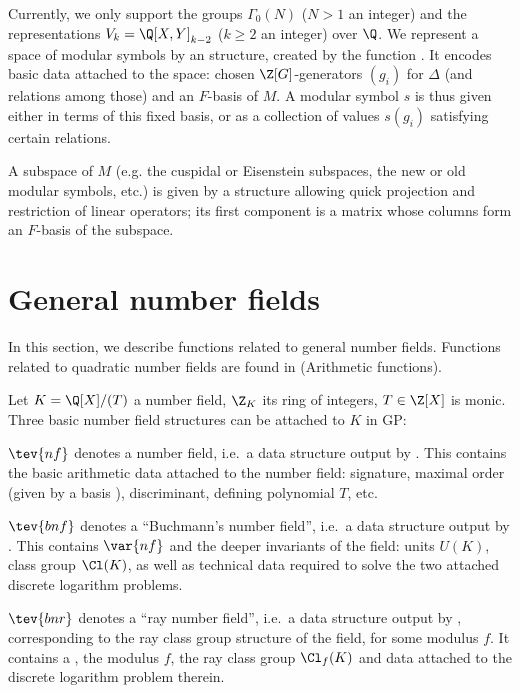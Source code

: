 Currently, we only support the groups $\Gamma_0(N)$ ($N > 1$ an integer)
and the representations $V_k = \Q[X,Y]_{k-2}$ ($k \geq 2$ an integer) over
$\Q$. We represent a space of modular symbols by an  structure,
created by the function . It encodes basic data attached to the
space: chosen $\Z[G]$-generators $(g_i)$ for $\Delta$ (and relations among
those) and an $F$-basis of $M$. A modular symbol $s$ is thus given either in
terms of this fixed basis, or as a collection of values $s(g_i)$
satisfying certain relations.

A subspace of $M$ (e.g. the cuspidal or Eisenstein subspaces, the new or
old modular symbols, etc.) is given by a structure allowing quick projection
and restriction of linear operators; its first component is a matrix whose
columns  form  an $F$-basis  of the subspace.


\section{General number fields}

In this section, we describe functions related to general number fields.
Functions related to quadratic number fields are found in
 (Arithmetic functions).


Let $K = \Q[X] / (T)$ a number field, $\Z_K$ its ring of integers, $T\in\Z[X]$
is monic. Three basic number field structures can be attached to $K$ in
GP:

\item $\tev{nf}$ denotes a number field, i.e.~a data structure output by
. This contains the basic arithmetic data attached to the
number field: signature, maximal order (given by a basis ),
discriminant, defining polynomial $T$, etc.

\item $\tev{bnf}$ denotes a ``Buchmann's number field'', i.e.~a
data structure output by . This contains
$\var{nf}$ and the deeper invariants of the field: units $U(K)$, class group
$\Cl(K)$, as well as technical data required to solve the two attached
discrete logarithm problems.

\item $\tev{bnr}$ denotes a ``ray number field'', i.e.~a data structure
output by , corresponding to the ray class group structure of
the field, for some modulus $f$. It contains a , the modulus
$f$, the ray class group $\Cl_f(K)$ and data attached to
the discrete logarithm problem therein.

